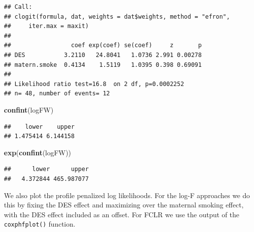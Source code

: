 \documentclass[
]{article}
\newenvironment{Shaded}{\begin{snugshade}}{\end{snugshade}}
\newcommand{\FunctionTok}[1]{\textcolor[rgb]{0.13,0.29,0.53}{\textbf{#1}}}
\newcommand{\NormalTok}[1]{#1}
\begin{document}
\begin{verbatim}
## Call:
## clogit(formula, dat, weights = dat$weights, method = "efron", 
##     iter.max = maxit)
## 
##                 coef exp(coef) se(coef)     z       p
## DES           3.2110   24.8041   1.0736 2.991 0.00278
## matern.smoke  0.4134    1.5119   1.0395 0.398 0.69091
## 
## Likelihood ratio test=16.8  on 2 df, p=0.0002252
## n= 48, number of events= 12
\end{verbatim}

\begin{Shaded}
\begin{Highlighting}[]
\FunctionTok{confint}\NormalTok{(logFW)}
\end{Highlighting}
\end{Shaded}

\begin{verbatim}
##    lower    upper 
## 1.475414 6.144158
\end{verbatim}

\begin{Shaded}
\begin{Highlighting}[]
\FunctionTok{exp}\NormalTok{(}\FunctionTok{confint}\NormalTok{(logFW))}
\end{Highlighting}
\end{Shaded}

\begin{verbatim}
##      lower      upper 
##   4.372844 465.987077
\end{verbatim}

We also plot the profile penalized log likelihoods. For the log-F
approaches we do this by fixing the DES effect and maximizing over the
maternal smoking effect, with the DES effect included as an offset. For
FCLR we use the output of the \texttt{coxphfplot()} function.
\end{document}
